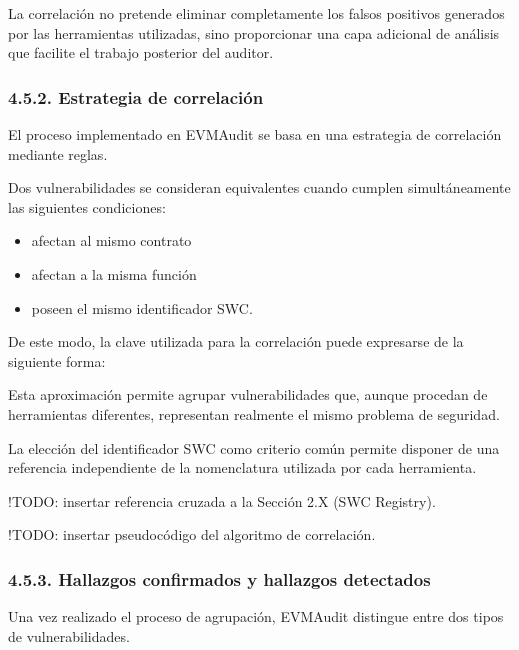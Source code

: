 La correlación no pretende eliminar completamente los falsos positivos
generados por las herramientas utilizadas, sino proporcionar una capa
adicional de análisis que facilite el trabajo posterior del auditor.

\subsubsection{4.5.2. Estrategia de
correlación}\label{estrategia-de-correlaciuxf3n}

El proceso implementado en EVMAudit se basa en una estrategia de
correlación mediante reglas.

Dos vulnerabilidades se consideran equivalentes cuando cumplen
simultáneamente las siguientes condiciones:

\begin{itemize}
\tightlist
\item
  afectan al mismo contrato
\item
  afectan a la misma función
\item
  poseen el mismo identificador SWC.
\end{itemize}

De este modo, la clave utilizada para la correlación puede expresarse de
la siguiente forma:

\begin{Shaded}
\begin{Highlighting}[]
\end{Highlighting}
\end{Shaded}

Esta aproximación permite agrupar vulnerabilidades que, aunque procedan
de herramientas diferentes, representan realmente el mismo problema de
seguridad.

La elección del identificador SWC como criterio común permite disponer
de una referencia independiente de la nomenclatura utilizada por cada
herramienta.

!TODO: insertar referencia cruzada a la Sección 2.X (SWC Registry).

!TODO: insertar pseudocódigo del algoritmo de correlación.

\subsubsection{4.5.3. Hallazgos confirmados y hallazgos
detectados}\label{hallazgos-confirmados-y-hallazgos-detectados}

Una vez realizado el proceso de agrupación, EVMAudit distingue entre dos
tipos de vulnerabilidades.

